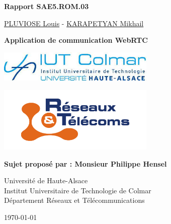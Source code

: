 \documentclass[12pt, a4paper, oneside]{thesis}
\begin{document}
\author{\href{https://portfolio.louispluviose.fr}{PLUVIOSE Louis} - \href{https://karap.fr}{KARAPETYAN Mikhail}}

\begin{center}
{\LARGE \textbf{Rapport SAE5.ROM.03}}

\vspace{1cm}

{\Large {\href{https://portfolio.louispluviose.fr}{PLUVIOSE Louis} - \href{https://karap.fr}{KARAPETYAN Mikhail}}}

\vspace{1cm}

{\LARGE \textbf{Application de communication WebRTC}}

\vspace{2cm}

\includegraphics[width=7.5cm]{images/logo-iut-colmar.jpg}

\vspace{0.5cm}

\includegraphics[width=7.5cm]{images/logo-but-rt.png}

\vspace{2cm}

\textbf{Sujet proposé par : Monsieur Philippe Hensel} \\

\vspace{1cm}

Université de Haute-Alsace \\
Institut Universitaire de Technologie de Colmar \\
Département Réseaux et Télécommunications \\

\vspace{3cm}

{\large \mydate\today}

\end{center}

\newpage

\tableofcontents
\end{document}
